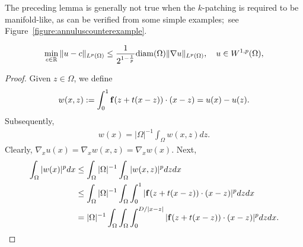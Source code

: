 \documentclass[a4paper]{article}
\begin{document}
The preceding lemma is generally not true when the $k$-patching is required to be manifold-like,
as can be verified from some simple examples;~see Figure~\ref{figure:annuluscounterexample}.

\color{Emerald}
\begin{align}
    \min\limits_{ c \in {\mathbb R} }
    \| u - c \|_{L^{p}(\Omega)}
    \leq 
    \frac{1}{ 2^{ 1 - \frac{1}{p} } }
    {\operatorname{diam}}(\Omega)
    \| \nabla u \|_{L^{p}(\Omega)}
    ,
    \quad 
    u \in W^{1,p}(\Omega)
    ,
\end{align}

\begin{proof}
    Given $z \in \Omega$, we define 
    \[
        w(x,z) 
        := 
        \int_0^1 {\mathbf f}( z + t(x-z) ) \cdot (x-z)
        =
        u(x) - u(z)
        .
    \]
    Subsequently,
    \begin{align*}
        w(x) = |\Omega|^{-1} \int_{\Omega} w(x,z) dz.
    \end{align*}
    Clearly, $\nabla_{x} u(x) = \nabla_{x} w(x,z) = \nabla_{x} w(x)$.
    Next, 
    \begin{align*}
        \int_{\Omega} | w(x) |^{p} dx
        &\leq 
        \int_{\Omega} |\Omega|^{-1} \int_{\Omega} | w(x,z) |^{p} dz dx
        \\&\leq 
        \int_{\Omega} |\Omega|^{-1} \int_{\Omega} \int_0^1 | {\mathbf f}( z + t(x-z) ) \cdot (x-z) |^{p} dz dx
        \\&= 
        |\Omega|^{-1} \int_{\Omega} \int_{\Omega} \int_0^{D/|x-z|} | {\mathbf f}( z + t(x-z) ) \cdot (x-z) |^{p} dz dx
        .
    \end{align*}

\end{proof}
\color{black}
\end{document}
